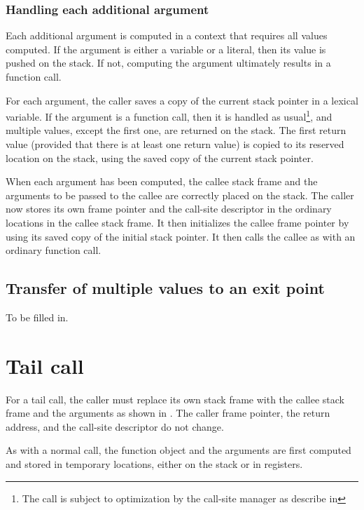 \subsubsection{Handling each additional argument}

Each additional argument is computed in a context that requires
all values computed.  If the argument is either a variable or a
literal, then its value is pushed on the stack.  If not, computing the
argument ultimately results in a function call.  

For each argument, the caller saves a copy of the current stack
pointer in a lexical variable.  If the argument is a function call,
then it is handled as usual\footnote{The call is subject to
  optimization by the call-site manager as describe in
  }, and multiple values, except the
first one, are returned on the stack.  The first return value
(provided that there is at least one return value) is copied to its
reserved location on the stack, using the saved copy of the current
stack pointer.

When each argument has been computed, the callee stack frame and the
arguments to be passed to the callee are correctly placed on the
stack.  The caller now stores its own frame pointer and the call-site
descriptor in the ordinary locations in the callee stack frame.  It
then initializes the callee frame pointer by using its saved copy of
the initial stack pointer.  It then calls the callee as with an
ordinary function call.

\subsection{Transfer of multiple values to an exit point}

To be filled in.

\section{Tail call}

For a tail call, the caller must replace its own stack frame with the
callee stack frame and the arguments as shown in
.  The caller frame pointer,
the return address, and the call-site descriptor do not change.

As with a normal call, the function object and the arguments are first
computed and stored in temporary locations, either on the stack or in
registers.

